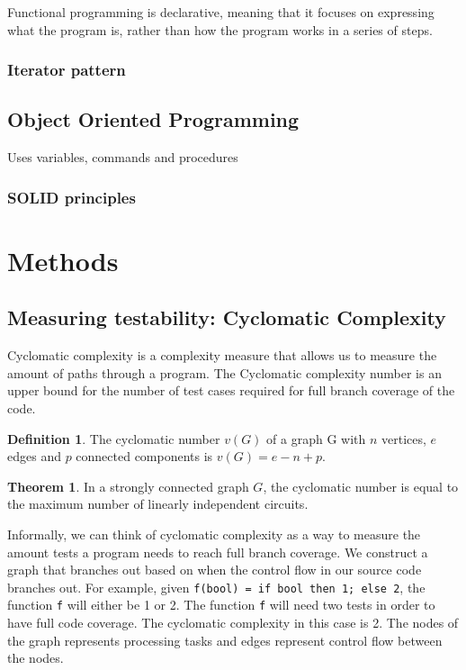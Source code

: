 \documentclass[12pt]{article}
\theoremstyle{definition}
\newtheorem*{definition}{Definition}
\theoremstyle{theorem}
\newtheorem*{theorem}{Theorem}
\begin{document}
Functional programming is declarative, meaning that it focuses on expressing
what the program is, rather than how the program works in a series of steps. 

\subsubsection{Iterator pattern}

\subsection{Object Oriented Programming}\label{oop}
Uses variables, commands and procedures

\subsubsection{SOLID principles}

\section{Methods}\label{methods}

\subsection{Measuring testability: Cyclomatic Complexity}\label{cyclomaticcomplexity}

Cyclomatic complexity is a complexity measure that allows us to measure the
amount of paths through a program. The Cyclomatic complexity number is an upper
bound for the number of test cases required for full branch coverage of the
code. 

\theoremstyle{definition}
\begin{definition}
The cyclomatic number $v(G)$ of a graph G with $n$ vertices, $e$ edges and $p$
connected components is $v(G) = e - n + p$.
\end{definition}

\begin{theorem}
In a strongly connected graph $G$, the cyclomatic number is equal to the
maximum number of linearly independent circuits.~\cite{McCabe}
\end{theorem}

Informally, we can think of cyclomatic complexity as a way to measure the amount
tests a program needs to reach full branch coverage. We construct a graph that
branches out based on when the control flow in our source code branches out. For
example, given \texttt{f(bool) = if bool then 1; else 2}, the function
\texttt{f} will either be 1 or 2. The function \texttt{f} will need two tests in
order to have full code coverage. The cyclomatic complexity in this case is 2.
The nodes of the graph represents processing tasks and edges represent control
flow between the nodes. 
\end{document}
